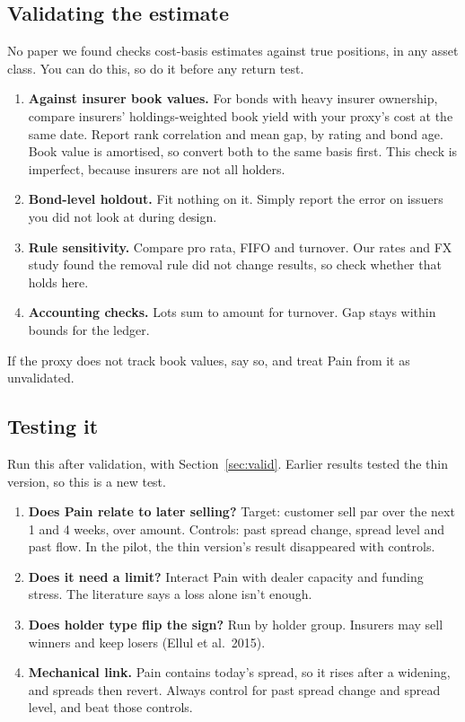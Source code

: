 \documentclass[11pt]{article}
\begin{document}
\subsection{Validating the estimate}\label{sec:costval}
No paper we found checks cost-basis estimates against true positions, in any asset class. You can do this, so do it before any return test.
\begin{enumerate}
\item \textbf{Against insurer book values.} For bonds with heavy insurer ownership, compare insurers' holdings-weighted book yield with your proxy's cost at the same date. Report rank correlation and mean gap, by rating and bond age. Book value is amortised, so convert both to the same basis first. This check is imperfect, because insurers are not all holders.
\item \textbf{Bond-level holdout.} Fit nothing on it. Simply report the error on issuers you did not look at during design.
\item \textbf{Rule sensitivity.} Compare pro rata, FIFO and turnover. Our rates and FX study found the removal rule did not change results, so check whether that holds here.
\item \textbf{Accounting checks.} Lots sum to amount for turnover. Gap stays within bounds for the ledger.
\end{enumerate}
If the proxy does not track book values, say so, and treat Pain from it as unvalidated.

\subsection{Testing it}
Run this after validation, with Section~\ref{sec:valid}. Earlier results tested the thin version, so this is a new test.
\begin{enumerate}
\item \textbf{Does Pain relate to later selling?} Target: customer sell par over the next 1 and 4 weeks, over amount. Controls: past spread change, spread level and past flow. In the pilot, the thin version's result disappeared with controls.
\item \textbf{Does it need a limit?} Interact Pain with dealer capacity and funding stress. The literature says a loss alone isn't enough.
\item \textbf{Does holder type flip the sign?} Run by holder group. Insurers may sell winners and keep losers (Ellul et al.\ 2015).
\item \textbf{Mechanical link.} Pain contains today's spread, so it rises after a widening, and spreads then revert. Always control for past spread change and spread level, and beat those controls.
\end{enumerate}
\end{document}
